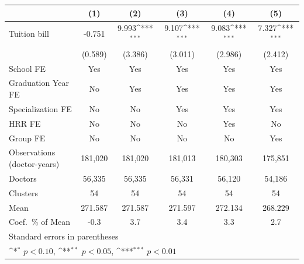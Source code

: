 {
\def\sym#1{\ifmmode^{#1}\else\(^{#1}\)\fi}
\begin{tabular}{l*{5}{c}}
\hline\hline
                    &\multicolumn{1}{c}{(1)}         &\multicolumn{1}{c}{(2)}         &\multicolumn{1}{c}{(3)}         &\multicolumn{1}{c}{(4)}         &\multicolumn{1}{c}{(5)}         \\
\hline
Tuition bill        &      -0.751         &       9.993\sym{***}&       9.107\sym{***}&       9.083\sym{***}&       7.327\sym{***}\\
                    &     (0.589)         &     (3.386)         &     (3.011)         &     (2.986)         &     (2.412)         \\
[1em]
School FE           &         Yes         &         Yes         &         Yes         &         Yes         &         Yes         \\
[1em]
Graduation Year FE  &          No         &         Yes         &         Yes         &         Yes         &         Yes         \\
[1em]
Specialization FE   &          No         &          No         &         Yes         &         Yes         &         Yes         \\
[1em]
HRR FE              &          No         &          No         &          No         &         Yes         &          No         \\
[1em]
Group FE            &          No         &          No         &          No         &          No         &         Yes         \\
\hline
Observations (doctor-years)&     181,020         &     181,020         &     181,013         &     180,303         &     175,851         \\
Doctors             &      56,335         &      56,335         &      56,331         &      56,120         &      54,186         \\
Clusters            &          54         &          54         &          54         &          54         &          54         \\
Mean                &     271.587         &     271.587         &     271.597         &     272.134         &     268.229         \\
Coef.\ \% of Mean   &        -0.3         &         3.7         &         3.4         &         3.3         &         2.7         \\
\hline\hline
\multicolumn{6}{l}{\footnotesize Standard errors in parentheses}\\
\multicolumn{6}{l}{\footnotesize \sym{*} \(p<0.10\), \sym{**} \(p<0.05\), \sym{***} \(p<0.01\)}\\
\end{tabular}
}
